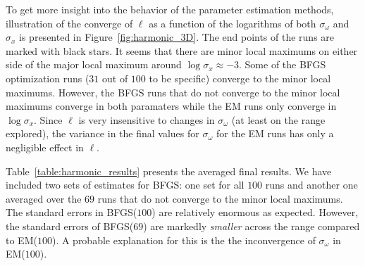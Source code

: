 To get more insight into the behavior of the parameter estimation methods, 
illustration of the converge of $\ell$ as a function of
the logarithms of both $\sigma_\omega$ and $\sigma_x$ is presented
in Figure~\ref{fig:harmonic_3D}. The end points of the runs are marked with black stars.
It seems that there are minor local maximums on either side of the major local maximum
around $\log\sigma_x\approx -3$. Some of the BFGS optimization runs ($31$ out of $100$ to be specific) 
converge to the minor local maximums. However, the BFGS runs that do not converge to the
minor local maximums converge in both paramaters while the EM runs only converge in $\log\sigma_x$.
Since $\ell$ is very insensitive to changes in $\sigma_\omega$ (at least on the range explored),
the variance in the final values for $\sigma_\omega$ for the EM runs has only a negligible
effect in $\ell$.  

Table~\ref{table:harmonic_results} presents 
the averaged final results. We have included two sets of estimates for BFGS:
one set for all $100$ runs and another one averaged over the $69$ runs
that do not converge to the minor local maximums. The standard errors in
BFGS($100$) are relatively enormous as expected. However, the standard errors
of BFGS($69$) are markedly \emph{smaller} across the range compared to
EM($100$). A probable explanation for this is the the inconvergence of
 $\sigma_\omega$ in EM($100$).



\begin{table}[htbp]
\caption{Parameter values used for simulation in Section~\ref{sec:harmonic}}
\label{table:harmonic_param}
\centering
\footnotesize
{}
\end{table}

